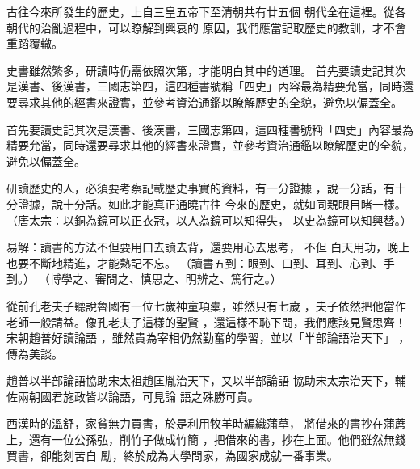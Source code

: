 \documentclass[avery5371,grid]{flashcards}
\begin{document}
{古往今來所發生的歷史，上自三皇五帝下至清朝共有廿五個
朝代全在這裡。從各朝代的治亂過程中，可以瞭解到興衰的
原因，我們應當記取歷史的教訓，才不會重蹈覆轍。} %
{} %

{史書雖然繁多，研讀時仍需依照次第，才能明白其中的道理。
首先要讀史記其次是漢書、後漢書，三國志第四，這四種書號稱「四史」內容最為精要允當，同時還要尋求其他的經書來證實，並參考資治通鑑以瞭解歷史的全貌，避免以偏蓋全。} %
{} %

{首先要讀史記其次是漢書、後漢書，三國志第四，這四種書號稱「四史」內容最為精要允當，同時還要尋求其他的經書來證實，並參考資治通鑑以瞭解歷史的全貌，避免以偏蓋全。} %
{} %

{研讀歷史的人，必須要考察記載歷史事實的資料，有一分證據
，說一分話，有十分證據，說十分話。如此才能真正通曉古往
今來的歷史，就如同親眼目睹一樣。} %
{（唐太宗：以銅為鏡可以正衣冠，以人為鏡可以知得失，
以史為鏡可以知興替。）} %


{易解：讀書的方法不但要用口去讀去背，還要用心去思考，
不但 白天用功，晚上也要不斷地精進，才能熟記不忘。} %
{（讀書五到：眼到、口到、耳到、心到、手到。）
（博學之、審問之、慎思之、明辨之、篤行之。）} %

{從前孔老夫子聽說魯國有一位七歲神童項橐，雖然只有七歲
，夫子依然把他當作老師一般請益。像孔老夫子這樣的聖賢
，還這樣不恥下問，我們應該見賢思齊！宋朝趙普好讀論語
，雖然貴為宰相仍然勤奮的學習，並以「半部論語治天下」
，傳為美談。} %
{} %

{趙普以半部論語協助宋太祖趙匡胤治天下，又以半部論語
協助宋太宗治天下，輔佐兩朝國君施政皆以論語，可見論
語之殊勝可貴。} %
{} %

{西漢時的溫舒，家貧無力買書，於是利用牧羊時編織蒲草，
將借來的書抄在蒲蓆上，還有一位公孫弘，削竹子做成竹簡
，把借來的書，抄在上面。他們雖然無錢買書，卻能刻苦自
勵，終於成為大學問家，為國家成就一番事業。} %
{} %
\end{document}
